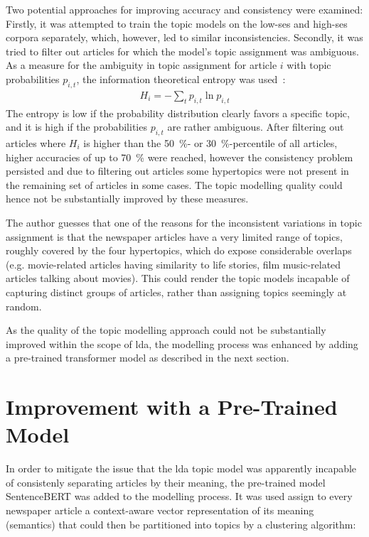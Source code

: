 Two potential approaches for improving accuracy and consistency were examined: Firstly, it was attempted to train the topic models on the low-\gls{ses} and high-\gls{ses} corpora separately, which, however, led to similar inconsistencies. Secondly, it was tried to filter out articles for which the model's topic assignment was ambiguous. As a measure for the ambiguity in topic assignment for article $i$ with topic probabilities $p_{i, t}$, the information theoretical entropy was used~\autocite{gray_entropy_2013}:
\begin{align}
    H_i = -\sum_t p_{i, t} \ln p_{i,t}
\end{align}
The entropy is low if the probability distribution clearly favors a specific topic, and it is high if the probabilities $p_{i, t}$ are rather ambiguous. After filtering out articles where $H_i$ is higher than the \SI{50}{\percent}- or \SI{30}{\percent}-percentile of all articles, higher accuracies of up to \SI{70}{\percent} were reached, however the consistency problem persisted and due to filtering out articles some hypertopics were not present in the remaining set of articles in some cases. The topic modelling quality could hence not be substantially improved by these measures.

The author guesses that one of the reasons for the inconsistent variations in topic assignment is that the newspaper articles have a very limited range of topics, roughly covered by the four hypertopics, which do expose considerable overlaps (e.g. movie-related articles having similarity to life stories, film music-related articles talking about movies). This could render the topic models incapable of capturing distinct groups of articles, rather than assigning topics seemingly at random.

As the quality of the topic modelling approach could not be substantially improved within the scope of \gls{lda}, the modelling process was enhanced by adding a pre-trained transformer model as described in the next section.

\section{Improvement with a Pre-Trained Model}\label{ch:pretrained_topic_modelling}
In order to mitigate the issue that the \gls{lda} topic model was apparently incapable of consistenly separating articles by their meaning, the pre-trained model SentenceBERT was added to the modelling process. It was used assign to every newspaper article a context-aware vector representation of its meaning (semantics) that could then be partitioned into topics by a clustering algorithm:

